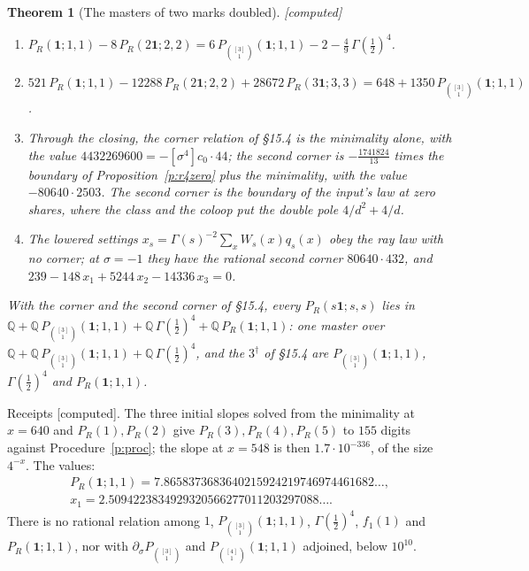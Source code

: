 \documentclass[11pt]{article}
\newcommand{\one}{\mathbf 1}
\newcommand{\Pth}{P_{\binom{[3]}1}(\one;1,1)}
\newcommand{\Pfour}{P_{\binom{[4]}1}(\one;1,1)}
\theoremstyle{plain}
\newtheorem{theorem}[proposition]{Theorem}
\theoremstyle{definition}
\theoremstyle{remark}
\newcommand{\computed}{\textup{[computed]}}
\begin{document}
\begin{theorem}[The masters of two marks doubled]\label{t:r4masters}\computed\
\begin{enumerate}[label=(\roman*)]
\item $P_R(\one;1,1)-8\,P_R(2\one;2,2)=6\,\Pth-2-\frac49\,\Gamma(\frac12)^4$.
\item $521\,P_R(\one;1,1)-12288\,P_R(2\one;2,2)+28672\,P_R(3\one;3,3)=648+1350\,\Pth$.
\item Through the closing, the corner relation of \S15.4 is the minimality alone, with the value $4432269600=-[\sigma^4]c_0\cdot44$; the second corner is $-\frac{1741824}{13}$ times the boundary of Proposition~\ref{p:r4zero} plus the minimality, with the value $-80640\cdot2503$. The second corner is the boundary of the input's law at zero shares, where the class and the coloop put the double pole $4/d^2+4/d$.
\item The lowered settings $x_s=\Gamma(s)^{-2}\sum_xW_s(x)q_s(x)$ obey the ray law with no corner; at $\sigma=-1$ they have the rational second corner $80640\cdot432$, and $239-148\,x_1+5244\,x_2-14336\,x_3=0$.
\end{enumerate}
With the corner and the second corner of \S15.4, every $P_R(s\one;s,s)$ lies in $\mathbb Q+\mathbb Q\,\Pth+\mathbb Q\,\Gamma(\frac12)^4+\mathbb Q\,P_R(\one;1,1)$: one master over $\mathbb Q+\mathbb Q\,\Pth+\mathbb Q\,\Gamma(\frac12)^4$, and the $3^\dagger$ of \S15.4 are $\Pth$, $\Gamma(\frac12)^4$ and $P_R(\one;1,1)$.
\end{theorem}

\noindent Receipts \computed. The three initial slopes solved from the minimality at $x=640$ and $P_R(1),P_R(2)$ give $P_R(3),P_R(4),P_R(5)$ to $155$ digits against Procedure~\ref{p:proc}; the slope at $x=548$ is then $1.7\cdot10^{-336}$, of the size $4^{-x}$. The values:
\begin{gather*}
P_R(\one;1,1)=7.8658373683640215924219746974461682\ldots,\\
x_1=2.5094223834929320566277011203297088\ldots .
\end{gather*}
There is no rational relation among $1$, $\Pth$, $\Gamma(\frac12)^4$, $f_1(1)$ and $P_R(\one;1,1)$, nor with $\partial_\sigma P_{\binom{[3]}1}$ and $\Pfour$ adjoined, below $10^{10}$.
\end{document}
